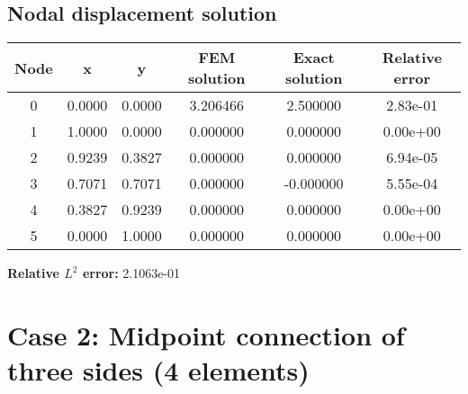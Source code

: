 \subsection{Nodal displacement solution}
\begin{tabular}{|c|c|c|c|c|c|}
\hline
Node & x & y & FEM solution & Exact solution & Relative error \\
\hline
0 & 0.0000 & 0.0000 & 3.206466 & 2.500000 & 2.83e-01 \\
1 & 1.0000 & 0.0000 & 0.000000 & 0.000000 & 0.00e+00 \\
2 & 0.9239 & 0.3827 & 0.000000 & 0.000000 & 6.94e-05 \\
3 & 0.7071 & 0.7071 & 0.000000 & -0.000000 & 5.55e-04 \\
4 & 0.3827 & 0.9239 & 0.000000 & 0.000000 & 0.00e+00 \\
5 & 0.0000 & 1.0000 & 0.000000 & 0.000000 & 0.00e+00 \\
\hline
\end{tabular}
\textbf{Relative $L^2$ error:} 2.1063e-01
\section{Case 2: Midpoint connection of three sides (4 elements)}
